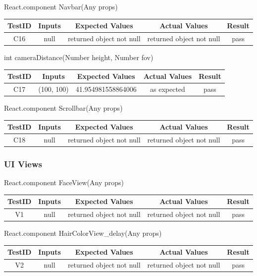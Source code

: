 \documentclass[12pt, titlepage]{article}
\begin{document}
React.component Navbar(Any props) \\
\begin{tabular}{ |c|c|c|c|c| } 
 \hline
 TestID & Inputs & Expected Values & Actual Values & Result \\ 
 \hline
 C16 & null & returned object not null & returned object not null & pass \\ 
 \hline
\end{tabular}

int cameraDistance(Number height, Number fov) \\
\begin{tabular}{ |c|c|c|c|c| } 
 \hline
 TestID & Inputs & Expected Values & Actual Values & Result \\ 
 \hline
 C17 & (100, 100) & 41.954981558864006 & as expected & pass \\ 
 \hline
\end{tabular}

React.component Scrollbar(Any props) \\
\begin{tabular}{ |c|c|c|c|c| } 
 \hline
 TestID & Inputs & Expected Values & Actual Values & Result \\ 
 \hline
 C18 & null & returned object not null & returned object not null & pass \\ 
 \hline
\end{tabular}

\subsubsection{UI Views}
React.component FaceView(Any props) \\
\begin{tabular}{ |c|c|c|c|c| } 
 \hline
 TestID & Inputs & Expected Values & Actual Values & Result \\ 
 \hline
 V1 & null & returned object not null & returned object not null & pass \\ 
 \hline
\end{tabular}

React.component HairColorView\_delay(Any props) \\
\begin{tabular}{ |c|c|c|c|c| } 
 \hline
 TestID & Inputs & Expected Values & Actual Values & Result \\ 
 \hline
 V2 & null & returned object not null & returned object not null & pass \\ 
 \hline
\end{tabular}
\end{document}
